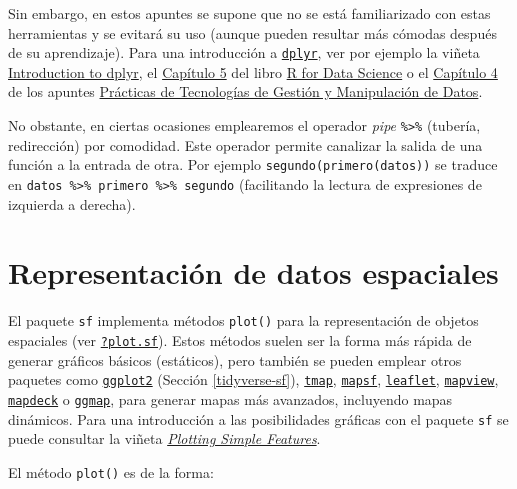 \documentclass[
  spanish,
]{book}
\theoremstyle{break}
\begin{document}
Sin embargo, en estos apuntes se supone que no se está familiarizado con estas herramientas y se evitará su uso (aunque pueden resultar más cómodas después de su aprendizaje).
Para una introducción a \href{https://dplyr.tidyverse.org}{\texttt{dplyr}}, ver por ejemplo la viñeta \href{https://cran.rstudio.com/web/packages/dplyr/vignettes/dplyr.html}{Introduction to dplyr},
el \href{http://r4ds.had.co.nz/transform.html}{Capítulo 5} del libro \href{http://r4ds.had.co.nz}{R for Data Science} o el \href{https://gltaboada.github.io/tgdbook/dplyr.html}{Capítulo 4} de los apuntes \href{https://gltaboada.github.io/tgdbook}{Prácticas de Tecnologías de Gestión y Manipulación de Datos}.

No obstante, en ciertas ocasiones emplearemos el operador \emph{pipe} \texttt{\%\textgreater{}\%} (tubería, redirección) por comodidad.
Este operador permite canalizar la salida de una función a la entrada de otra.
Por ejemplo \texttt{segundo(primero(datos))} se traduce en \texttt{datos\ \%\textgreater{}\%\ primero\ \%\textgreater{}\%\ segundo}
(facilitando la lectura de expresiones de izquierda a derecha).

\hypertarget{representaciuxf3n-de-datos-espaciales}{%
\section{Representación de datos espaciales}\label{representaciuxf3n-de-datos-espaciales}}

El paquete \texttt{sf} implementa métodos \texttt{plot()} para la representación de objetos espaciales (ver \href{https://r-spatial.github.io/sf/reference/plot.html}{\texttt{?plot.sf}}).
Estos métodos suelen ser la forma más rápida de generar gráficos básicos (estáticos), pero también se pueden emplear otros paquetes como \href{https://ggplot2.tidyverse.org}{\texttt{ggplot2}} (Sección \ref{tidyverse-sf}), \href{https://r-tmap.github.io/tmap}{\texttt{tmap}}, \href{https://riatelab.github.io/mapsf}{\texttt{mapsf}}, \href{https://rstudio.github.io/leaflet}{\texttt{leaflet}}, \href{https://r-spatial.github.io/mapview}{\texttt{mapview}}, \href{https://symbolixau.github.io/mapdeck}{\texttt{mapdeck}} o \href{https://github.com/dkahle/ggmap}{\texttt{ggmap}}, para generar mapas más avanzados, incluyendo mapas dinámicos.
Para una introducción a las posibilidades gráficas con el paquete \texttt{sf} se puede consultar la viñeta \href{https://r-spatial.github.io/sf/articles/sf5.html}{\emph{Plotting Simple Features}}.

El método \texttt{plot()} es de la forma:
\end{document}
